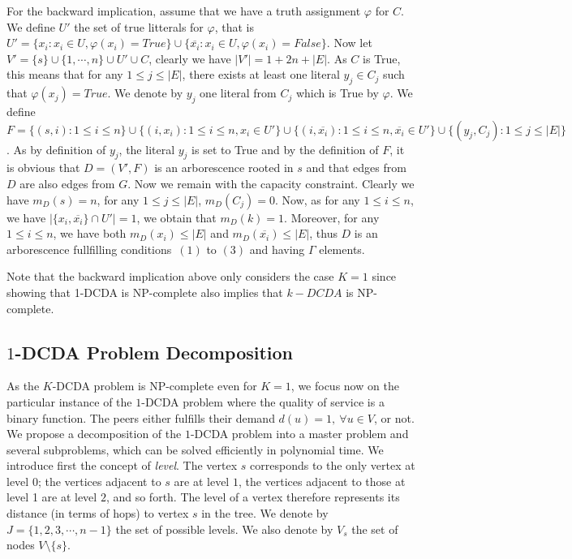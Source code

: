 For the backward implication, assume that we have a truth assignment
$\varphi$ for $C$.  We define $U'$ the set of true litterals for
$\varphi$, that is $U'=\{x_i : x_i \in U, \varphi(x_i)=True\}\cup
\{\overline{x_i} : x_i \in U, \varphi(x_i)=False\}$.  Now let
$V'=\{s\}\cup \{1,\cdots,n\} \cup U' \cup C$, clearly we have
$|V'|=1+2n+|E|$.  As $C$ is True, this means that for any $1\leq j\leq
|E|$, there exists at least one literal $y_j \in C_j$ such that
$\varphi(x_j)=True$.  We denote by $y_j$ one literal from $C_j$ which
is True by $\varphi$.  We define $F=\{(s,i): 1\leq i \leq n\}\cup \{
(i,x_i) : 1\leq i\leq n, x_i \in U'\}\cup \{ (i,\overline{x_i}) :
1\leq i\leq n, \overline{x_i} \in U'\}\cup \{(y_j,C_j) : 1\leq j \leq
|E|\}$.  As by definition of $y_j$, the literal $y_j$ is set to True
and by the definition of $F$, it is obvious that $D=(V',F)$ is an
arborescence rooted in $s$ and that edges from $D$ are also edges from
$G$.  Now we remain with the capacity constraint.  Clearly we have
$m_D(s)=n$, for any $1\leq j \leq |E|$, $m_D(C_j)=0$.  Now, as for any
$1\leq i \leq n$, we have $|\{x_i,\overline{x_i}\}\cap U'|=1$, we
obtain that $m_D(k)=1$.  Moreover, for any $1\leq i \leq n$, we have
both $m_D(x_i)\leq |E|$ and $m_D(\overline{x_i})\leq |E|$, thus $D$ is
an arborescence fullfilling conditions~$(1)$ to $(3)$ and having
$\Gamma$ elements.  \epr

Note that the backward implication above only considers the case $K =
1$ since showing that 1-DCDA is NP-complete also implies that $k-DCDA$
is NP-complete.





\subsection{$1$-DCDA Problem Decomposition}

As the $K$-DCDA problem is NP-complete even for $K=1$, we focus now on
the particular instance of the $1$-DCDA problem where the quality of
service is a binary function. The peers either fulfills their demand
$d(u)= 1, \ \forall u \in V$, or not. We propose a decomposition of
the $1$-DCDA problem into a master problem and several subproblems,
which can be solved efficiently in polynomial time. We introduce first
the concept of \emph{level}. The vertex $s$ corresponds to the only
vertex at level $0$; the vertices adjacent to $s$ are at level $1$,
the vertices adjacent to those at level 1 are at level $2$, and so
forth.  The level of a vertex therefore represents its distance (in
terms of hops) to vertex $s$ in the tree. We denote by $J =
\{1,2,3,\cdots, n-1\}$ the set of possible levels. We also denote by
$V_s$ the set of nodes $V \setminus \{s\}$.

